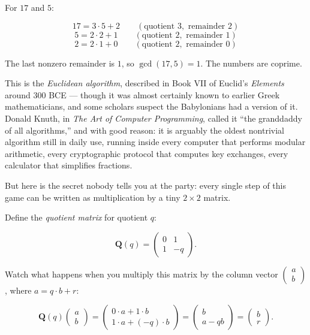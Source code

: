 For \(17\) and \(5\):

\[
17 = 3 \cdot 5 + 2 \qquad (\text{quotient } 3, \text{ remainder } 2)
\] \[
5 = 2 \cdot 2 + 1 \qquad (\text{quotient } 2, \text{ remainder } 1)
\] \[
2 = 2 \cdot 1 + 0 \qquad (\text{quotient } 2, \text{ remainder } 0)
\]

The last nonzero remainder is \(1\), so \(\gcd(17, 5) = 1\). The numbers are coprime.

This is the \emph{Euclidean algorithm}, described in Book VII of Euclid's \emph{Elements} around 300 BCE --- though it was almost certainly known to earlier Greek mathematicians, and some scholars suspect the Babylonians had a version of it. Donald Knuth, in \emph{The Art of Computer Programming}, called it ``the granddaddy of all algorithms,'' and with good reason: it is arguably the oldest nontrivial algorithm still in daily use, running inside every computer that performs modular arithmetic, every cryptographic protocol that computes key exchanges, every calculator that simplifies fractions.

But here is the secret nobody tells you at the party: every single step of this game can be written as multiplication by a tiny \(2 \times 2\) matrix.

Define the \emph{quotient matrix} for quotient \(q\):

\[
\mathbf{Q}(q) = \begin{pmatrix} 0 & 1 \\ 1 & -q \end{pmatrix}.
\]

Watch what happens when you multiply this matrix by the column vector \(\begin{pmatrix} a \\ b \end{pmatrix}\), where \(a = q \cdot b + r\):

\[
\mathbf{Q}(q) \begin{pmatrix} a \\ b \end{pmatrix} = \begin{pmatrix} 0 \cdot a + 1 \cdot b \\ 1 \cdot a + (-q) \cdot b \end{pmatrix} = \begin{pmatrix} b \\ a - qb \end{pmatrix} = \begin{pmatrix} b \\ r \end{pmatrix}.
\]

